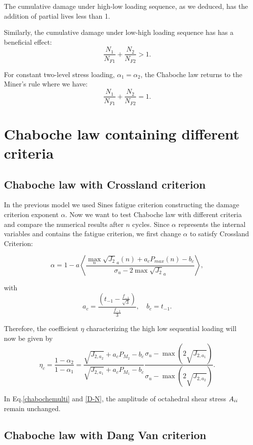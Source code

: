 The cumulative damage under high-low loading sequence, as we deduced, has the addition of partial lives less than 1. 

Similarly, the cumulative damage under low-high loading sequence has has a beneficial effect: 
$$\frac{N_1}{N_{F1}}+\frac{N_2}{N_{F2}}>1.$$

For constant two-level stress loading, $\alpha_1=\alpha_2$, the Chaboche law returns to the Miner's rule where we have:
$$\frac{N_1}{N_{F1}}+\frac{N_2}{N_{F2}}=1.$$
\section{Chaboche law containing different criteria}
\subsection{Chaboche law with Crossland criterion}

In the previous model we used Sines fatigue criterion constructing the damage criterion exponent $\alpha$. Now we want to test Chaboche law with different criteria and compare the numerical results after $n$ cycles. Since $\alpha$ represents the internal variables and contains the fatigue criterion, we first change $\alpha$ to satisfy Crossland Criterion:

\begin{equation}\alpha = 1 - a\left\langle \frac{\max\limits_{n}\sqrt{J_2}_a(n)+a_c{P_{max}(n)}-b_c}{ \sigma_{u} - 2\max\sqrt{J_2}_a}\right\rangle,\end{equation}

with
\begin{equation}
a_c=\frac{(t_{-1}-\frac{f_{-1}}{\sqrt{3}})}{\frac{f_{-1}}{3}}, \quad 
b_c=t_{-1}.
\end{equation}

Therefore, the coefficient $\eta$ characterizing the high low sequential loading will now be given by
\begin{equation}\eta_c=\frac{1-\alpha_2}{1-\alpha_1}=
\frac{\sqrt{J_{2,a_2}}+a_cP_{M_2}-b_c}{\sqrt{J_{2,a_1}}+a_cP_{M_1}-b_c}\frac{ \sigma_{u} - \max(2\sqrt{J_{2,a_1}})}{  \sigma_{u} - \max(2\sqrt{J_{2,a_2}})}.
\end{equation}

In Eq.\eqref{chabochemulti} and \eqref{D-N}, the amplitude of octahedral shear stress $A_{\uppercase\expandafter{\romannumeral2}}$ remain unchanged.

\subsection{Chaboche law with Dang Van criterion}

